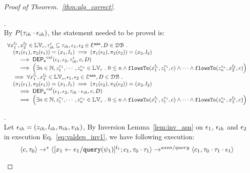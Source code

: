 \begin{proof}[Proof of Theorem.~\ref{thm:alg_correct}]
\begin{case}
\end{case}
\begin{case}
\label{case:valdep_ih}.
\\
%
By $P(\mathtt{\tau}_{ih} \cdot \mathtt{\epsilon}_{ih})$, the statement needed to be proved is:
$$
\begin{array}{l}
\forall {x}_1^{l_1}, {x}_2^{l_2} \in \mathbb{LV}_{{c}}, \mathtt{\tau}_{ih}' \subseteq \mathtt{\tau}_{ih},
\mathtt{\epsilon}_1, \mathtt{\epsilon}_2 \in \mathcal{E}^{\mathtt{{asn}}}, D \in \mathcal{DB} ~.~
\\ \quad
(\pi_{1}{(\mathtt{\epsilon}_1)}, \pi_{2}{(\mathtt{\epsilon}_1)}) = ({x}_1, l_1)
\implies
(\pi_{1}{(\mathtt{\epsilon}_2)}, \pi_{2}{(\mathtt{\epsilon}_2)}) = ({x}_2, l_2)
 \\ \qquad \implies 
\mathsf{DEP_{\mathtt{e}}}^{val}(\mathtt{\epsilon}_1, \mathtt{\epsilon}_2, \mathtt{\tau}_{ih}', c, D)
 \\ \qquad \implies
   \Big(\exists  n \in \mathbb{N}, z_1^{r_1}, \cdots, z_n^{r_n} \in \mathbb{LV}_{{c}} ~.~ 0 \leq n
 \land \mathtt{flowsTo}(x_1^{l_1}, z_1^{r_1}, c) \land \cdots \land \mathtt{flowsTo}(z_n^{r_n}, {x}_2^{l_2}, c) \Big)
\\ \quad \implies
\forall {x}_1^{l_1}, {x}_2^{l_2} \in \mathbb{LV}_{{c}},
\mathtt{\epsilon}_1, \mathtt{\epsilon}_2 \in \mathcal{E}^{\mathtt{{asn}}}, D \in \mathcal{DB} ~.~
\\ \quad
(\pi_{1}{(\mathtt{\epsilon}_1)}, \pi_{2}{(\mathtt{\epsilon}_1)}) = ({x}_1, l_1)
\implies
(\pi_{1}{(\mathtt{\epsilon}_2)}, \pi_{2}{(\mathtt{\epsilon}_2)}) = ({x}_2, l_2)
 \\ \qquad \implies 
\mathsf{DEP_{\mathtt{e}}}^{val}(\mathtt{\epsilon}_1, \mathtt{\epsilon}_2, \mathtt{\tau}_{ih} \cdot \mathtt{\epsilon}_{ih}, c, D)
 \\ \qquad \implies
   \Big(\exists  n \in \mathbb{N}, z_1^{r_1}, \cdots, z_n^{r_n} \in \mathbb{LV}_{{c}} ~.~ 0 \leq n
 \land \mathtt{flowsTo}(x_1^{l_1}, z_1^{r_1}, c) \land \cdots \land \mathtt{flowsTo}(z_n^{r_n}, {x}_2^{l_2}, c) \Big)
\end{array}
$$
%
\begin{subcase}
\label{case:valdep_ihindep}.
\\
Let $\mathtt{\epsilon}_{ih} = (z_{ih}, l_{ih}, n_{ih}, v_{ih})$, 
%
By Inversion Lemma~\ref{lem:inv_asn} on $\mathtt{\epsilon}_1$, $\mathtt{\epsilon}_{ih}$ and $\mathtt{\epsilon}_2$ in execution Eq.~\ref{eq:valdep_inv1}, we have following execution:
\begin{equation}
\label{eq:m1asn_inv1}
  \begin{array}{l}   
\langle {c}, \mathtt{\tau}_0 \rangle \rightarrow^{*} 
\langle [\mathrel{ {x}_1 \leftarrow e_1 / {\tt query}(\psi_1) }]^{l_1} ; {c}_1, \mathtt{\tau}_0 \cdot \mathtt{\tau}_1 \rangle  \rightarrow^{assn/query}
 \langle c_1, \mathtt{\tau}_0 \cdot \mathtt{\tau}_1 \cdot \mathtt{\epsilon}_1 \rangle \\

\end{array}
\end{equation}
\end{subcase}
\end{case}
\end{proof}
